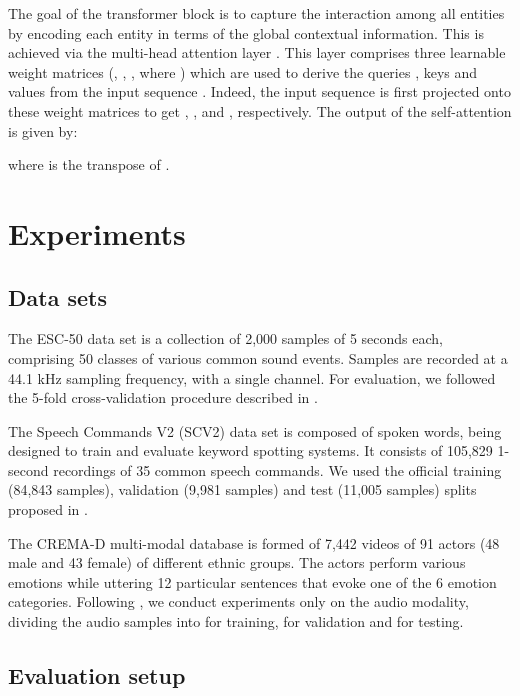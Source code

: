 \documentclass[a4paper]{article}
\begin{document}
The goal of the transformer block is to capture the interaction among all  entities by encoding each entity in terms of the global contextual information. This is achieved via the multi-head attention layer . This layer comprises three learnable weight matrices (, , , where ) which are used to derive the queries , keys  and values  from the input sequence . Indeed, the input sequence  is
first projected onto these weight matrices to get , , and , respectively. The output  of the self-attention is given by:

where  is the transpose of . 










\section{Experiments}

\subsection{Data sets}

The ESC-50 \cite{Piczak-ACMMM-2015} data set is a collection of 2,000 samples of 5 seconds each, comprising 50 classes of various common sound events. Samples are recorded at a 44.1 kHz sampling frequency, with a single channel. For evaluation, we followed the 5-fold cross-validation procedure described in \cite{Gong-INTERSPEECH-2021}.

The Speech Commands V2 (SCV2) \cite{Warden-ArXiv-2018} data set is composed of spoken words, being designed to train and evaluate keyword spotting systems. It consists of 105,829 1-second recordings of 35 common speech commands. We used the official training (84,843 samples), validation (9,981 samples) and test (11,005 samples) splits proposed in \cite{Warden-ArXiv-2018}.

The CREMA-D multi-modal database \cite{Cao-TAC-2014} is formed of 7,442 videos of 91 actors (48 male and 43 female) of different ethnic groups. The actors perform various emotions while uttering 12 particular sentences that evoke one of the 6 emotion categories. 
Following \cite{Ristea-INTERSPEECH-2021}, we conduct experiments only on the audio modality, dividing the audio samples into  for training,  for validation and  for testing.

\subsection{Evaluation setup}
\end{document}
